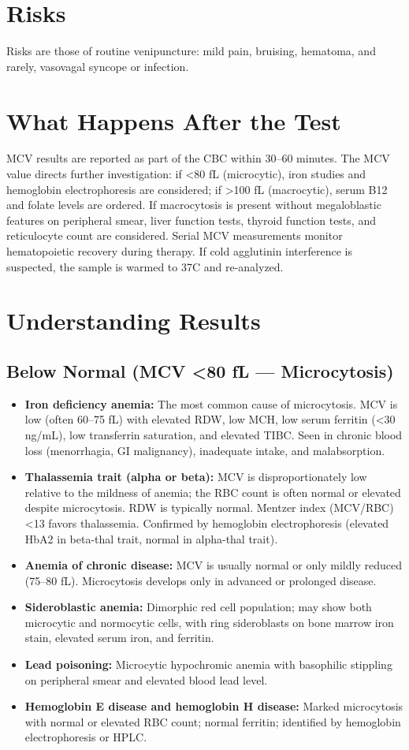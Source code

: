 \section*{Risks}
Risks are those of routine venipuncture: mild pain, bruising, hematoma, and rarely, vasovagal syncope or infection.

\section*{What Happens After the Test}
MCV results are reported as part of the CBC within 30--60 minutes. The MCV value directs further investigation: if <80 fL (microcytic), iron studies and hemoglobin electrophoresis are considered; if >100 fL (macrocytic), serum B12 and folate levels are ordered. If macrocytosis is present without megaloblastic features on peripheral smear, liver function tests, thyroid function tests, and reticulocyte count are considered. Serial MCV measurements monitor hematopoietic recovery during therapy. If cold agglutinin interference is suspected, the sample is warmed to 37\textdegree{}C and re-analyzed.

\section*{Understanding Results}

\subsection*{Below Normal (MCV <80 fL --- Microcytosis)}
\begin{itemize}
  \item \textbf{Iron deficiency anemia:} The most common cause of microcytosis. MCV is low (often 60--75 fL) with elevated RDW, low MCH, low serum ferritin (<30 ng/mL), low transferrin saturation, and elevated TIBC. Seen in chronic blood loss (menorrhagia, GI malignancy), inadequate intake, and malabsorption.
  \item \textbf{Thalassemia trait (alpha or beta):} MCV is disproportionately low relative to the mildness of anemia; the RBC count is often normal or elevated despite microcytosis. RDW is typically normal. Mentzer index (MCV/RBC) <13 favors thalassemia. Confirmed by hemoglobin electrophoresis (elevated HbA2 in beta-thal trait, normal in alpha-thal trait).
  \item \textbf{Anemia of chronic disease:} MCV is usually normal or only mildly reduced (75--80 fL). Microcytosis develops only in advanced or prolonged disease.
  \item \textbf{Sideroblastic anemia:} Dimorphic red cell population; may show both microcytic and normocytic cells, with ring sideroblasts on bone marrow iron stain, elevated serum iron, and ferritin.
  \item \textbf{Lead poisoning:} Microcytic hypochromic anemia with basophilic stippling on peripheral smear and elevated blood lead level.
  \item \textbf{Hemoglobin E disease and hemoglobin H disease:} Marked microcytosis with normal or elevated RBC count; normal ferritin; identified by hemoglobin electrophoresis or HPLC.
\end{itemize}

